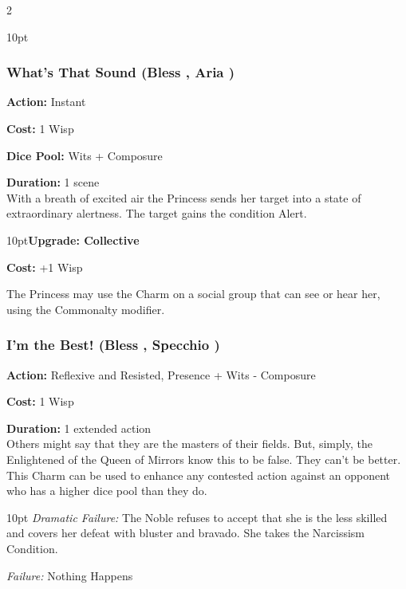 \begin{multicols}{2}
\begin{myindentpar}{10pt}
 \end{myindentpar}
  
\subsubsection*{What's That Sound (Bless \textbullet, Aria \textbullet)}

\noindent \textbf{Action:} Instant

\noindent \textbf{Cost:} 1 Wisp

\noindent \textbf{Dice Pool:} Wits + Composure

\noindent \textbf{Duration:} 1 scene \\

\noindent With a breath of excited air the Princess sends her target into a state of extraordinary alertness. The target gains the condition Alert. 

\begin{myindentpar}{10pt}\textbf{Upgrade: Collective}

\noindent \textbf{Cost:} +1 Wisp

The Princess may use the Charm on a social group that can see or hear her, using the Commonalty modifier. 
\end{myindentpar}

 
\subsubsection*{I'm the Best! (Bless \textbullet, Specchio \textbullet)}

\noindent \textbf{Action:} Reflexive and Resisted, Presence + Wits - Composure 

\noindent \textbf{Cost:} 1 Wisp

\noindent \textbf{Duration:} 1 extended action\\

\noindent Others might say that they are the masters of their fields. But, simply, the Enlightened of the Queen of Mirrors know this to be false. They can’t be better. This Charm can be used to enhance any contested action against an opponent who has a higher dice pool than they do.

\begin{myindentpar}{10pt} \emph{Dramatic Failure:} The Noble refuses to accept that she is the less skilled and covers her defeat with bluster and bravado. She takes the Narcissism Condition.

\emph{Failure:} Nothing Happens 


\end{myindentpar}
\end{multicols}

